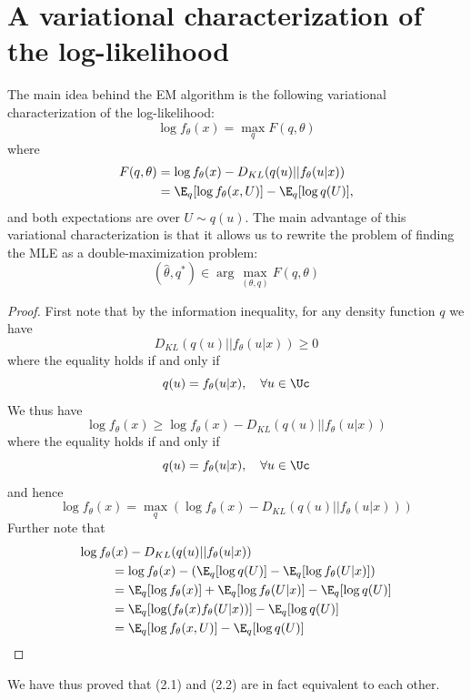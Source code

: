 \section{A variational characterization of the log-likelihood}
The main idea behind the EM algorithm is the following variational characterization of the log-likelihood:
\[
    \log f_\theta(x) = \max_{q} F(q, \theta)
\]
where
\begin{align}
    F(q,\theta) & = \log f_\theta(x) - D_{KL}(q(u)|| f_\theta(u|x)) \\
                & = \E_q[\log f_\theta(x, U)] - \E_q[\log q(U)],
\end{align}
and both expectations are over $U \sim q(u)$. The main advantage of this variational characterization
is that it allows us to rewrite the problem of finding the MLE as a double-maximization problem:
\[
    (\hat{\theta}, q^*) \in \arg \max_{(\theta, q)} F(q, \theta)
\]
\begin{proof}
    First note that by the information inequality, for any density function $q$ we have
    \[
        D_{KL}(q(u) || f_\theta(u|x)) \geq 0
    \]
    where the equality holds if and only if
    \[
        q(u) = f_\theta(u | x), \quad\forall u \in\Uc
    \]
    We thus have
    \[
        \log f_\theta(x) \geq \log f_\theta(x) - D_{KL}(q(u) || f_\theta(u | x))
    \]
    where the equality holds if and only if
    \[
        q(u) = f_\theta(u | x), \quad\forall u \in \Uc
    \]
    and hence
    \[
        \log f_\theta(x) = \max_{q} (\log f_\theta(x) - D_{KL}(q(u) || f_\theta(u|x)))
    \]
    Further note that
    \begin{align*}
        \log f_\theta & (x) - D_{KL}(q(u) || f_\theta(u | x))                                  \\
                      & = \log f_\theta(x) - (\E_q[\log q(U)] - \E_q[\log f_\theta(U|x)])      \\
                      & = \E_q [\log f_\theta(x)] + \E_q[\log f_\theta(U|x)] - \E_q[\log q(U)] \\
                      & = \E_q [\log (f_\theta(x)f_\theta(U|x))] - \E_q[\log q(U)]             \\
                      & = \E_q[\log f_\theta(x, U)] - \E_q[\log q(U)]
    \end{align*}
\end{proof}
We have thus proved that (2.1) and (2.2) are in fact equivalent to each other.

